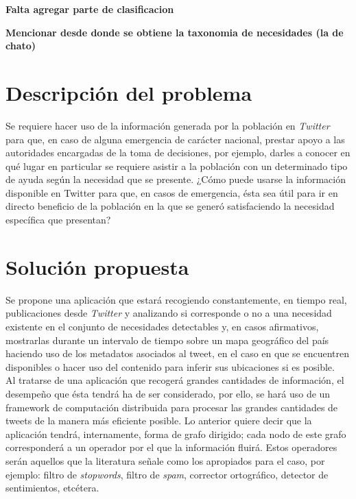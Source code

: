 \textbf{Falta agregar parte de clasificacion}

\textbf{Mencionar desde donde se obtiene la taxonomia de necesidades (la de chato)}

	
\section{Descripción del problema}
\label{intro:problema}

Se requiere hacer uso de la información generada por la población en \textit{Twitter} para que, en caso de alguna emergencia de carácter nacional, prestar apoyo a las autoridades encargadas de la toma de decisiones, por ejemplo, darles a conocer en qué lugar en particular se requiere asistir a la población con un determinado tipo de ayuda según la necesidad que se presente. ¿Cómo puede usarse la información disponible en Twitter para que, en casos de emergencia, ésta sea útil para ir en directo beneficio de la población en la que se generó satisfaciendo la necesidad específica que presentan?

\section{Solución propuesta}
\label{intro:solucion}

Se propone una aplicación que estará recogiendo constantemente, en tiempo real, publicaciones desde \textit{Twitter} y analizando si corresponde o no a una necesidad existente en el conjunto de necesidades detectables y, en casos afirmativos, mostrarlas durante un intervalo de tiempo sobre un mapa geográfico del país haciendo uso de los metadatos asociados al tweet, en el caso en que se encuentren disponibles o hacer uso del contenido para inferir sus ubicaciones si es posible.\\

Al tratarse de una aplicación que recogerá grandes cantidades de información, el desempeño que ésta tendrá ha de ser considerado, por ello, se hará uso de un framework de computación distribuida para procesar las grandes cantidades de tweets de la manera más eficiente posible. Lo anterior quiere decir que la aplicación tendrá, internamente, forma de grafo dirigido; cada nodo de este grafo corresponderá a un operador por el que la información fluirá. Estos operadores serán aquellos que la literatura señale como los apropiados para el caso, por ejemplo: filtro de \textit{stopwords}, filtro de \textit{spam}, corrector ortográfico, detector de sentimientos, etcétera.\\

